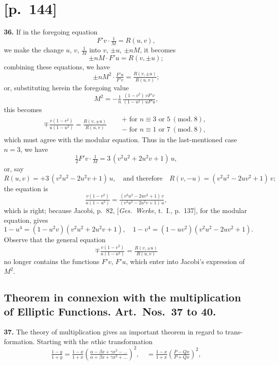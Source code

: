 \documentclass[11pt]{article}
\providecommand{\modd}{\mathrm{mod}}
\begin{document}
\section*{[p.~144]}

\noindent\textbf{36.} If in the foregoing equation
\[
F'v\cdot\tfrac{1}{M}=R(u,v),
\]
we make the change $u$, $v$, $\tfrac{1}{M}$ into $v$, $\pm u$, $\pm nM$, it becomes
\[
\pm nM\cdot F'u=R(v,\pm u);
\]
combining these equations, we have
\[
\pm nM^2\cdot\tfrac{F'u}{F'v}=\tfrac{R(v,\pm u)}{R(u,v)};
\]
or, substituting herein the foregoing value
\[
M^2=-\tfrac{1}{n}\,\tfrac{(1-v^2)\,vF'v}{(1-u^2)\,uF'u},
\]
this becomes
\[
\mp\tfrac{v(1-v^2)}{u(1-u^2)}=\tfrac{R(v,\pm u)}{R(u,v)}\quad\begin{aligned}&+\text{ for }n\equiv 3\text{ or }5\ (\modd.\ 8),\\
&-\text{ for }n\equiv 1\text{ or }7\ (\modd.\ 8),\end{aligned}
\]
which must agree with the modular equation. Thus in the last-mentioned case $n=3$,
we have
\[
\tfrac{1}{2}F'v\cdot\tfrac{1}{M}=3\,(v^2u^2+2u^2v+1)\,u,
\]
or, say
\[
R(u,v)=+3\,(v^2u^2-2u^2v+1)\,u,\quad
\text{and therefore}\quad R(v,-u)=(v^2u^2-2uv^2+1)\,v;
\]
the equation is
\[
\tfrac{v(1-v^2)}{u(1-u^2)}=\tfrac{(v^2u^2-2uv^2+1)\,v}{(v^2u^2-2u^2v+1)\,u},
\]
which is right; because Jacobi, p.~82, [\textit{Ges.\ Werke}, t.~I., p.~137], for the modular equation, gives
\[
1-u^4=(1-u^2v)(v^2u^2+2u^2v+1),\quad 1-v^4=(1-uv^2)(v^2u^2-2uv^2+1).
\]
Observe that the general equation
\[
\mp\tfrac{v(1-v^2)}{u(1-u^2)}=\tfrac{R(v,\pm u)}{R(u,v)}
\]
no longer contains the functions $F'v$, $F'u$, which enter into Jacobi's expression of $M^2$.

\subsection*{Theorem in connexion with the multiplication of Elliptic Functions. Art.\ Nos.\ 37 to 40.}

\noindent\textbf{37.} The theory of multiplication gives an important theorem in regard to trans-
formation. Starting with the $n$thic transformation
\[
\tfrac{1-y}{1+y}=\tfrac{1-x}{1+x}\!\left(\tfrac{\alpha-\beta x+\gamma x^2-\ldots}{\alpha+\beta x+\gamma x^2+\ldots}\right)^{\!2}\!,\quad =\tfrac{1-x}{1+x}\!\left(\tfrac{P-Qx}{P+Qx}\right)^{\!2}\!,
\]
\end{document}
